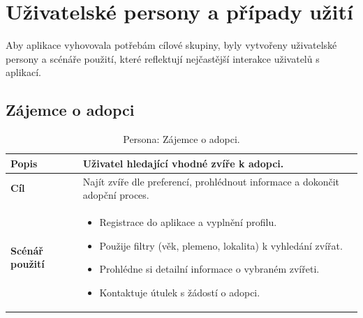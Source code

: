 \documentclass[czech, bp, kiv, he, iso690numb, pdf]{fasthesis}
\begin{document}
    \section{Uživatelské persony a případy užití}

    Aby aplikace vyhovovala potřebám cílové skupiny, byly vytvořeny uživatelské persony a scénáře použití, které reflektují nejčastější interakce uživatelů s aplikací.
    \pagebreak
    \subsection{Zájemce o adopci}
    \begin{table}[h!]
        \centering
        \renewcommand{\arraystretch}{1.4}
        \begin{tabular}{|p{3cm}|p{10cm}|}
            \hline
            \textbf{Popis} & Uživatel hledající vhodné zvíře k adopci. \\ \hline
            \textbf{Cíl} & Najít zvíře dle preferencí, prohlédnout informace a dokončit adopční proces. \\ \hline
            \textbf{Scénář použití} &
            \begin{itemize}
                \item Registrace do aplikace a vyplnění profilu.
                \item Použije filtry (věk, plemeno, lokalita) k vyhledání zvířat.
                \item Prohlédne si detailní informace o vybraném zvířeti.
                \item Kontaktuje útulek s žádostí o adopci.
            \end{itemize} \\ \hline
        \end{tabular}
        \caption{Persona: Zájemce o adopci.}
        \label{tab:persona_adopter}
    \end{table}
\end{document}
